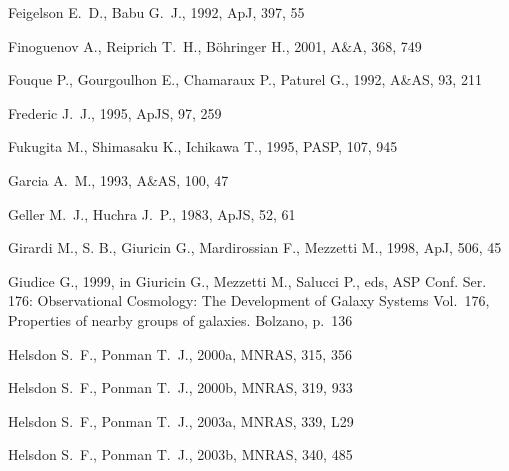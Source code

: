 \documentclass[usenatbib]{mn2e}
\begin{document}
\begin{thebibliography}{}
Feigelson E.~D.,  Babu G.~J.,  1992, ApJ, 397, 55

Finoguenov A.,  Reiprich T.~H.,    B{\" o}hringer H.,  2001, A\&A, 368, 749

Fouque P.,  Gourgoulhon E.,  Chamaraux P.,    Paturel G.,  1992, A\&AS, 93, 211

Frederic J.~J.,  1995, ApJS, 97, 259

Fukugita M.,  Shimasaku K.,    Ichikawa T.,  1995, PASP, 107, 945

Garcia A.~M.,  1993, A\&AS, 100, 47

Geller M.~J.,  Huchra J.~P.,  1983, ApJS, 52, 61

Girardi M.,  S. B.,  Giuricin G.,  Mardirossian F.,    Mezzetti M.,  1998, ApJ,
  506, 45

Giudice G.,  1999, in Giuricin G.,  Mezzetti M.,   Salucci P.,  eds, ASP Conf.
  Ser. 176: Observational Cosmology: The Development of Galaxy Systems
  Vol.~176, Properties of nearby groups of galaxies.
Bolzano, p.~136

Helsdon S.~F.,  Ponman T.~J.,  2000a, MNRAS, 315, 356

Helsdon S.~F.,  Ponman T.~J.,  2000b, MNRAS, 319, 933

Helsdon S.~F.,  Ponman T.~J.,  2003a, MNRAS, 339, L29

Helsdon S.~F.,  Ponman T.~J.,  2003b, MNRAS, 340, 485


\end{thebibliography}
\end{document}
